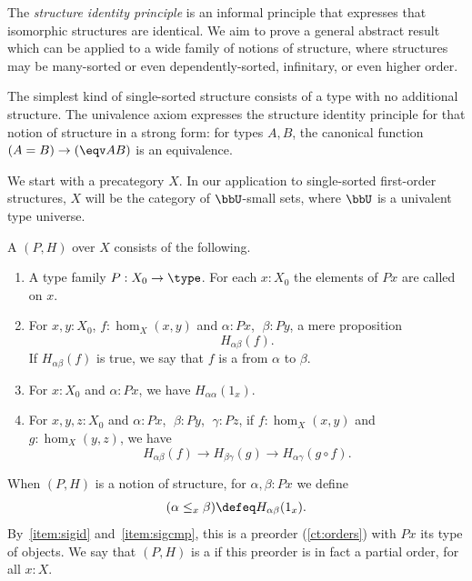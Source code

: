 The \emph{structure identity principle} is an informal principle
that expresses that isomorphic structures are identical.  We aim to
prove a general abstract result which can be applied to a wide family
of notions of structure, where structures may be many-sorted or even
dependently-sorted, infinitary, or even higher order.

The simplest kind of single-sorted structure consists of a type with
no additional structure.  The univalence axiom expresses the structure identity principle for that
notion of structure in a strong form: for types $A,B$, the
canonical function $(A=B)\to (\eqv A B)$ is an equivalence.

We start with a precategory $X$.  In our application to
single-sorted first-order structures, $X$ will be the category %
of $\bbU$-small sets, where $\bbU$ is a univalent type universe.

\begin{defn}\label{ct:sig}
  A 
  $(P,H)$ over $X$ consists of the following.
  \begin{enumerate}
  \item A type family $P:X_0 \to \type$.
    For each $x:X_0$ the elements of $Px$ are called 
    on $x$.
  \item For $x,y:X_0$, $f:\hom_X(x,y)$ and $\alpha:Px$, $\;\beta:Py$, a mere proposition
  \[ H_{\alpha\beta}(f).\]
    If $H_{\alpha\beta}(f)$ is true, we say that $f$ is a 
    from $\alpha$ to $\beta$.
  \item For $x:X_0$ and $\alpha:Px$, we have $H_{\alpha\alpha}(1_x)$.\label{item:sigid}
  \item For $x,y,z:X_0$ and $\alpha:Px$, $\;\beta:Py$, $\;\gamma:Pz$,
if $f:\hom_X(x,y)$ and $g:\hom_X(y,z)$, we have\label{item:sigcmp}
  \[ H_{\alpha\beta}(f)\to H_{\beta\gamma}(g)\to H_{\alpha\gamma}(g\circ   f).\]
   \end{enumerate}
  When $(P,H)$ is a notion of structure, for $\alpha,\beta:Px$ we define
  \[ (\alpha\leq_x\beta) \defeq H_{\alpha\beta}(1_x).\]
  By~\ref{item:sigid} and~\ref{item:sigcmp}, this is a preorder (\cref{ct:orders}) with $Px$ its type of objects.
  We say that $(P,H)$ is a 
  if this preorder is in fact a partial order, for all $x:X$.
\end{defn}

